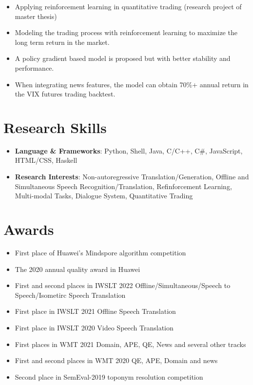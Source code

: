 \documentclass{resume_en}
\begin{document}
\begin{itemize}
    \item Applying reinforcement learning in quantitative trading (research project of master thesis)
    \item Modeling the trading process with reinforcement learning to maximize the long term return in the market.
    \item A policy gradient based model is proposed but with better stability and performance.
    \item When integrating news features, the model can obtain 70\%+ annual return in the VIX futures trading backtest.
\end{itemize}

\section{Research Skills}
\begin{itemize}[parsep=0.2ex]
  \item \textbf{Language \& Frameworks}: Python, Shell, Java, C/C++, C\#, JavaScript, HTML/CSS, Haskell
  \item \textbf{Research Interests}: Non-autoregressive Translation/Generation, Offline and Simultaneous Speech Recognition/Translation, Refinforcement Learning, Multi-modal Tasks, Dialogue System, Quantitative Trading
\end{itemize}

\section{Awards}
\begin{itemize}[parsep=0.2ex]
  \item First place of Huawei's Mindspore algorithm competition
  \item The 2020 annual quality award in Huawei
  \item First and second places in IWSLT 2022 Offline/Simultaneous/Speech to Speech/Isometirc Speech Translation
  \item First place in IWSLT 2021 Offline Speech Translation
  \item First place in IWSLT 2020 Video Speech Translation
  \item First places in WMT 2021 Domain, APE, QE, News and several other tracks
  \item First and second places in WMT 2020 QE, APE, Domain and news
  \item Second place in SemEval-2019 toponym resolution competition
\end{itemize}
\end{document}
